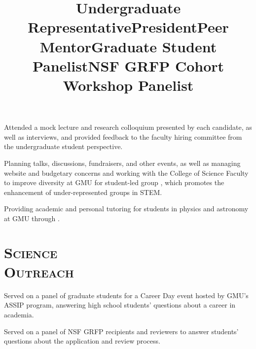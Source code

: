 \documentclass[marg, centered]{res}
\begin{document}
\begin{resume}
\vspace{-0.3cm}
\title{\textbf{Undergraduate Representative}}
\begin{position}
Attended a mock lecture and research colloquium presented by each candidate, as well as interviews, and provided feedback to the faculty hiring committee from the undergraduate student perspective.
\end{position}

\vspace{-0.3cm}
\title{\textbf{President}}
\begin{position}
Planning talks, discussions, fundraisers, and other events, as well as managing website and budgetary concerns and working with the College of Science Faculty to improve diversity at GMU for student-led group \href{https://gmuspectrum.squarespace.com/}{\color{dkbu}{Spectrum}}, which promotes the enhancement of under-represented groups in STEM.
\end{position}

\vspace{-0.3cm}
\title{\textbf{Peer Mentor}}
\begin{position}
Providing academic and personal tutoring for students in physics and astronomy at GMU through \href{https://gmuspectrum.squarespace.com/}{\color{dkbu}{Spectrum}}.
\end{position}

\section{{\scshape \bfseries Science\\ Outreach}}

\title{\textbf{Graduate Student Panelist}}
\begin{position}
Served on a panel of graduate students for a Career Day event hosted by GMU's ASSIP program, answering high school students' questions about a career in academia.
\end{position}
\vspace{-0.3cm}

\title{\textbf{NSF GRFP Cohort Workshop Panelist}}
\begin{position}
Served on a panel of NSF GRFP recipients and reviewers to answer students' questions about the application and review process.
\end{position}
\vspace{-0.3cm}


\end{resume}
\end{document}
